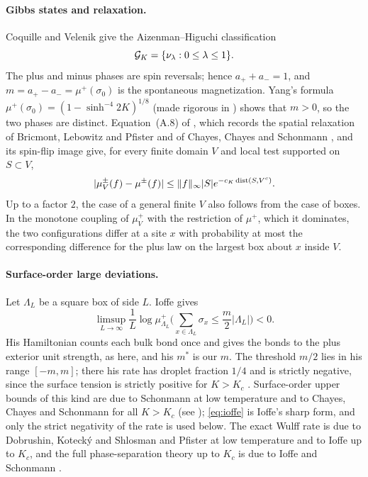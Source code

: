 \paragraph{Gibbs states and relaxation.}
Coquille and Velenik \cite[Corollary~1.1]{CV} give the Aizenman--Higuchi classification
\begin{equation}\label{eq:DLR}
 \mathcal G_K=\{\nu_\lambda:0\le\lambda\le1\}.
\end{equation}
The plus and minus phases are spin reversals; hence $a_++a_-=1$, and $m=a_+-a_-=\mu^+(\sigma_0)$ is the spontaneous magnetization. Yang's formula $\mu^+(\sigma_0)=(1-\sinh^{-4}2K)^{1/8}$ \cite{Yang52} (made rigorous in \cite{BGJS73}) shows that $m>0$, so the two phases are distinct. Equation~(A.8) of \cite{CV}, which records the spatial relaxation of Bricmont, Lebowitz and Pfister \cite{BLP81} and of Chayes, Chayes and Schonmann \cite{CCS87}, and its spin-flip image give, for every finite domain $V$ and local test supported on $S\subset V$,
\begin{equation}\label{eq:relax}
 |\mu_V^\pm(f)-\mu^\pm(f)|
 \le \|f\|_\infty |S|e^{-c_K\operatorname{dist}(S,V^c)}.
\end{equation}
Up to a factor $2$, the case of a general finite $V$ also follows from the case of boxes. In the monotone coupling of $\mu_V^+$ with the restriction of $\mu^+$, which it dominates, the two configurations differ at a site $x$ with probability at most the corresponding difference for the plus law on the largest box about $x$ inside $V$.

\paragraph{Surface-order large deviations.}
Let $\Lambda_L$ be a square box of side $L$. Ioffe \cite[Theorem~1.1, (1.5)]{Ioffe95} gives
\begin{equation}\label{eq:ioffe}
 \limsup_{L\to\infty}\frac1L\log\mu^+_{\Lambda_L}\Big(\sum_{x\in\Lambda_L}\sigma_x\le\frac m2|\Lambda_L|\Big)<0.
\end{equation}
His Hamiltonian counts each bulk bond once and gives the bonds to the plus exterior unit strength, as here, and his $m^*$ is our $m$. The threshold $m/2$ lies in his range $[-m,m]$; there his rate has droplet fraction $1/4$ and is strictly negative, since the surface tension is strictly positive for $K>K_c$ \cite{LP81}. Surface-order upper bounds of this kind are due to Schonmann \cite{Schonmann87} at low temperature and to Chayes, Chayes and Schonmann \cite{CCS87} for all $K>K_c$ (see \cite[Section~1]{Ioffe95}); \eqref{eq:ioffe} is Ioffe's sharp form, and only the strict negativity of the rate is used below. The exact Wulff rate is due to Dobrushin, Koteck\'y and Shlosman \cite{DKS92} and Pfister \cite{Pfister91} at low temperature and to Ioffe \cite{Ioffe95,Ioffe94} up to $K_c$, and the full phase-separation theory up to $K_c$ is due to Ioffe and Schonmann \cite{IoffeSchonmann98}.

